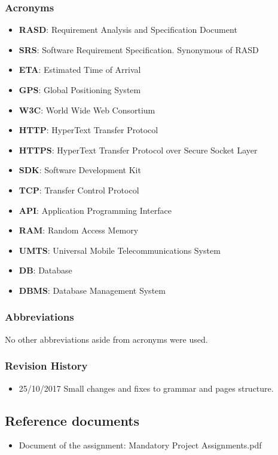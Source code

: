 \subsubsection{Acronyms}
\begin{itemize}
\item \textbf{RASD}: Requirement Analysis and Specification Document
\item \textbf{SRS}: Software Requirement Specification. Synonymous of RASD
\item \textbf{ETA}: Estimated Time of Arrival
\item \textbf{GPS}: Global Positioning System
\item \textbf{W3C}: World Wide Web Consortium
\item \textbf{HTTP}: HyperText Transfer Protocol 
\item \textbf{HTTPS}: HyperText Transfer Protocol over Secure Socket Layer 
\item \textbf{SDK}: Software Development Kit
\item \textbf{TCP}: Transfer Control Protocol
\item \textbf{API}: Application Programming Interface
\item \textbf{RAM}: Random Access Memory
\item \textbf{UMTS}: Universal Mobile Telecommunications System
\item \textbf{DB}: Database
\item \textbf{DBMS}: Database Management System
\end{itemize}
\subsubsection{Abbreviations}
No other abbreviations aside from acronyms were used.
\subsubsection{Revision History}
\begin{itemize}
\item 25/10/2017 Small changes and fixes to grammar and pages structure.
\end{itemize}
\subsection{Reference documents}
\begin{itemize}
\item Document of the assignment: Mandatory Project Assignments.pdf
\end{itemize}